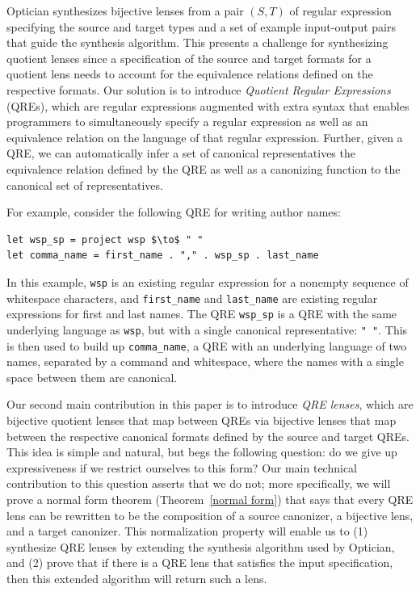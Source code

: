 \documentclass[acmsmall,review,anonymous]{acmart}
\begin{document}
Optician synthesizes bijective lenses from a pair $(S, T)$ of regular expression
specifying the source and target types and a set of example input-output pairs
that guide the synthesis algorithm. This presents a challenge for synthesizing
quotient lenses since a specification of the source and target formats for a
quotient lens needs to account for the equivalence relations defined on the
respective formats. Our solution is to introduce {\em Quotient Regular
Expressions} (QREs), which are regular expressions augmented with extra
syntax that enables programmers to simultaneously specify a regular expression
as well as an equivalence relation on the language of that regular expression.
Further, given a QRE, we can automatically infer a set of canonical
representatives the equivalence relation defined by the QRE as well as a
canonizing function to the canonical set of representatives.

For example, consider the following QRE for writing author names:
%
\begin{lstlisting}
let wsp_sp = project wsp $\to$ " "
let comma_name = first_name . "," . wsp_sp . last_name
\end{lstlisting}
%
In this example, \lstinline{wsp} is an existing regular expression for a
nonempty sequence of whitespace characters, and \lstinline{first_name} and
\lstinline{last_name} are existing regular expressions for first and last names.
The QRE \lstinline{wsp_sp} is a QRE with the same underlying language as
\lstinline{wsp}, but with a single canonical representative: \lstinline{" "}.
This is then used to build up \lstinline{comma_name}, a QRE with an
underlying language of two names, separated by a command and whitespace, where
the names with a single space between them are canonical.

Our second main contribution in this paper is to introduce {\em QRE lenses},
which are bijective quotient lenses that map between QREs via bijective lenses
that map between the respective canonical formats defined by the source and
target QREs. This idea is simple and natural, but begs the following question:
do we give up expressiveness if we restrict ourselves to this form? Our main
technical contribution to this question asserts that we do not; more
specifically, we will prove a normal form theorem (Theorem~\ref{normal form})
that says that every QRE lens can be rewritten to be the composition of a
source canonizer, a bijective lens, and a target canonizer. This normalization
property will enable us to (1) synthesize QRE lenses by extending the synthesis
algorithm used by Optician, and (2) prove that if there is a QRE lens that
satisfies the input specification, then this extended algorithm will return
such a lens.
\end{document}
